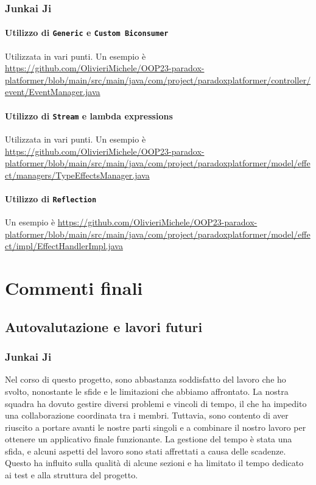 \documentclass[a4paper,12pt]{report}
\begin{document}
\subsection{Junkai Ji}

\subsubsection{Utilizzo di \texttt{Generic} e \texttt{Custom Biconsumer}}
Utilizzata in vari punti.
Un esempio è 
\url{https://github.com/OlivieriMichele/OOP23-paradox-platformer/blob/main/src/main/java/com/project/paradoxplatformer/controller/event/EventManager.java}

\subsubsection{Utilizzo di \texttt{Stream} e lambda expressions}
Utilizzata in vari punti.
Un esempio è 
\url{https://github.com/OlivieriMichele/OOP23-paradox-platformer/blob/main/src/main/java/com/project/paradoxplatformer/model/effect/managers/TypeEffectsManager.java}

\subsubsection{Utilizzo di \texttt{Reflection}}
Un esempio è 
\url{https://github.com/OlivieriMichele/OOP23-paradox-platformer/blob/main/src/main/java/com/project/paradoxplatformer/model/effect/impl/EffectHandlerImpl.java}

	
\chapter{Commenti finali}

\section{Autovalutazione e lavori futuri}

\subsection{Junkai Ji}
Nel corso di questo progetto, sono abbastanza soddisfatto del lavoro che ho svolto, nonostante le sfide e le limitazioni che abbiamo affrontato. La nostra squadra ha dovuto gestire diversi problemi e vincoli di tempo, il che ha impedito una collaborazione coordinata tra i membri. Tuttavia, sono contento di aver riuscito a portare avanti le nostre parti singoli e a combinare il nostro lavoro per ottenere un applicativo finale funzionante. La gestione del tempo è stata una sfida, e alcuni aspetti del lavoro sono stati affrettati a causa delle scadenze. Questo ha influito sulla qualità di alcune sezioni e ha limitato il tempo dedicato ai test e alla struttura del progetto.
\end{document}
